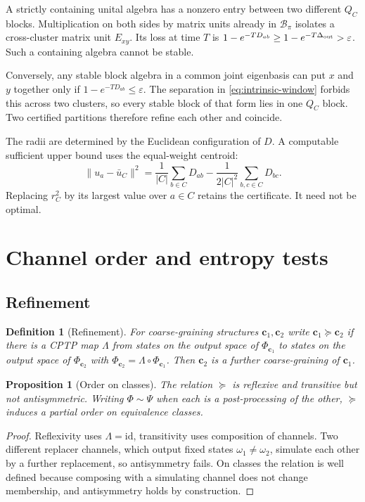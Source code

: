 \documentclass[12pt,a4paper]{article}
\newtheorem{proposition}[theorem]{Proposition}
\newtheorem{definition}[theorem]{Definition}
\begin{document}
A strictly containing unital algebra has a nonzero entry between
two different $Q_C$ blocks. Multiplication on both sides by
matrix units already in $\mathcal B_\pi$ isolates a cross-cluster
matrix unit $E_{xy}$. Its loss at time $T$ is
$1-e^{-TD_{ab}}\ge1-e^{-T\Delta_{\rm out}}>\varepsilon$.
Such a containing algebra cannot be stable.

Conversely, any stable block algebra in a common joint eigenbasis
can put $x$ and $y$ together only if
$1-e^{-TD_{ab}}\le\varepsilon$. The separation in
\eqref{eq:intrinsic-window} forbids this across two clusters, so
every stable block of that form lies in one $Q_C$ block.
Two certified partitions therefore refine each other and coincide.

The radii are determined by the Euclidean configuration of $D$.
A computable sufficient upper bound uses the equal-weight centroid:
\[
 \|u_a-\bar u_C\|^2
 =\frac1{|C|}\sum_{b\in C}D_{ab}
   -\frac1{2|C|^2}\sum_{b,c\in C}D_{bc}.
\]
Replacing $r_C^2$ by its largest value over $a\in C$ retains the
certificate. It need not be optimal.

\section{Channel order and entropy tests}
\label{app:entropy-tests}
\subsection{Refinement}

\begin{definition}[Refinement]
\label{def:refine}
For coarse-graining structures $\mathbf c_1,\mathbf c_2$ write $\mathbf c_1\succeq\mathbf c_2$ if there is a CPTP map $\Lambda$ from states on the output space of $\Phi_{\mathbf c_1}$ to states on the output space of $\Phi_{\mathbf c_2}$ with $\Phi_{\mathbf c_2}=\Lambda\circ\Phi_{\mathbf c_1}$. Then $\mathbf c_2$ is a further coarse-graining of $\mathbf c_1$.
\end{definition}

\begin{proposition}[Order on classes]
\label{prop:order}
The relation $\succeq$ is reflexive and transitive but not antisymmetric. Writing $\Phi\sim\Psi$ when each is a post-processing of the other, $\succeq$ induces a partial order on equivalence classes.
\end{proposition}

\begin{proof}
Reflexivity uses $\Lambda=\mathrm{id}$, transitivity uses composition of channels. Two different replacer channels, which output fixed states $\omega_1\ne\omega_2$, simulate each other by a further replacement, so antisymmetry fails. On classes the relation is well defined because composing with a simulating channel does not change membership, and antisymmetry holds by construction.
\end{proof}
\end{document}
